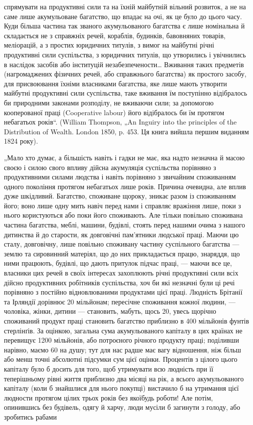 \parcont{}  %
спрямувати на продуктивні сили та на їхній майбутній вільний розвиток,
а не на саме лише акумульоване багатство, що впадає на очі, як це
було до цього часу. Куди більша частина так званого акумульованого
багатства є лише номінальна й складається не з справжніх речей, кораблів,
будинків, бавовняних товарів, меліорацій, а з простих юридичних
титулів, з вимог на майбутні річні продуктивні сили суспільства, з юридичних
титулів, що утворились і увічнились в наслідок засобів або
інституцій незабезпечености\dots{} Вживання таких предметів (нагромаджених
фізичних речей, або справжнього багатства) як простого
засобу, для присвоювання їхніми власниками багатства, яке лише мають
утворити майбутні продуктивні сили суспільства, таке вживання їм поступінно
відібралось би природними законами розподілу, не вживаючи
сили; за допомогою кооперованої праці (Cooperative labour) його
відібралось би їм протягом небагатьох років“. (William Thompson, „An
Inguiry into the principles of the Distribution of Wealth. London 1850, p. 453.
Ця книга вийшла першим виданням 1824 року).

„Мало хто думає, а більшість навіть і гадки не має, яка надто
незначна й масою своєю і силою свого впливу дійсна акумуляція суспільства
порівняно з продуктивними силами людства і навіть порівняно
з звичайним споживанням одного покоління протягом небагатьох лише
років. Причина очевидна, але вплив дуже шкідливий. Багатство, споживане
щороку, зникає разом із споживанням його; воно лише одну мить
навіч перед нами і справляє вражіння лише, поки з нього користуються
або поки його споживають. Але тільки повільно споживана частина
багатства, меблі, машини, будівлі, стоять перед нашими очима з нашого
дитинства й до старости, як довговічні пам’ятники людської праці.
Маючи цю сталу, довговічну, лише повільно споживану частину суспільного
багатства — землю та сировинний матеріял, що до них прикладається
працю, знаряддя, що ними працюють, будівлі, що дають притулок підчас
праці, — маючи все це, власники цих речей в своїх інтересах захоплюють
річні продуктивні сили всіх дійсно продуктивних робітників суспільства,
хоч би які незначні були ці речі порівняно з постійно відновлюваними
продуктами цієї праці. Людність Брітанії та Ірляндії дорівнює 20 мільйонам;
пересічне споживання кожної людини, — чоловіка, жінки, дитини —
становить, мабуть, щось 20, увесь щорічно споживаний продукт
праці становить багатство приблизно в 400 мільйонів фунтів стерлінґів. За оцінкою,
загальна сума акумульованого капіталу в цих країнах не перевищує
1200 мільйонів, або потроєного річного продукту праці; поділивши
нарівно, маємо 60 на душу; тут для нас радше має вагу відношення,
ніж більш або менш точні абсолютні підсумки сум цієї оцінки.
Процентів з цілого цього капіталу було б досить для того, щоб утримувати
всю людність при її теперішньому рівні життя приблизно два
місяці на рік, а всього акумульованого капіталу (коли б знайшлися для
нього покупці) вистачило б на утримання цієї людности протягом цілих
трьох років без якоїбудь роботи! Але потім, опинившись без будівель,
одягу й харчу, люди мусіли б загинути з голоду, або зробитись рабами
\parbreak{}  %
